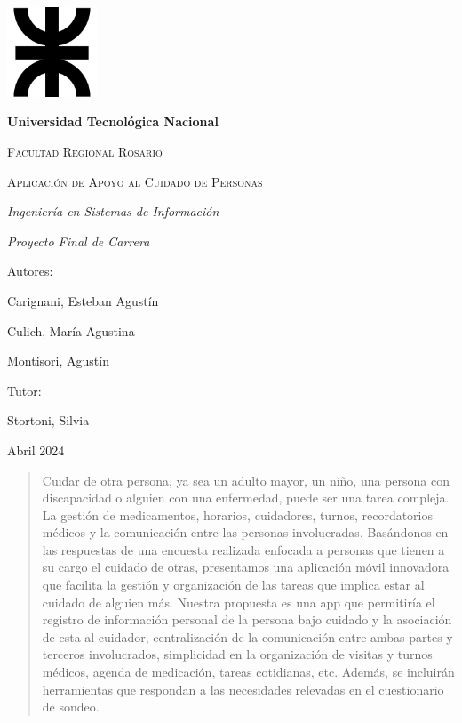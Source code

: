 \documentclass[a4paper,12pt]{article}
\begin{document}
    \begin{titlepage}
        \centering
        \includegraphics[width=0.2\textwidth]{Imagenes/LogoUTN.png}\par
        \vfill
        {\bfseries\LARGE Universidad Tecnológica Nacional \par}
        \vfill
        {\scshape\Large Facultad Regional Rosario \par}
        \vfill
        {\scshape\Huge Aplicación de Apoyo al Cuidado de Personas \par}
        \vfill
        {\itshape\Large Ingeniería en Sistemas de Información \par}
        {\itshape\Large Proyecto Final de Carrera \par}
        \vfill
        {\Large Autores: \par}
        {\Large Carignani, Esteban Agustín \par}
        {\Large Culich, María Agustina \par}
        {\Large Montisori, Agustín \par}
        \vfill
        {\Large Tutor: \par}
        {\Large Stortoni, Silvia \par}
        \vfill
        {\Large Abril 2024 \par}
    \end{titlepage}

    \begin{abstract}
        Cuidar de otra persona, ya sea un adulto mayor, 
        un niño, una persona con discapacidad o alguien 
        con una enfermedad, puede ser una tarea compleja. 
        La gestión de medicamentos, horarios, cuidadores, 
        turnos, recordatorios médicos y la comunicación 
        entre las personas involucradas.
        Basándonos en las respuestas de una encuesta realizada 
        enfocada a personas que tienen a su cargo el 
        cuidado de otras, presentamos una aplicación móvil 
        innovadora que facilita la gestión y organización de 
        las tareas que implica estar al cuidado de alguien más. 
        Nuestra propuesta es una app que permitiría el registro 
        de información personal de la persona bajo cuidado y 
        la asociación de esta al cuidador, centralización de 
        la comunicación entre ambas partes y terceros 
        involucrados, simplicidad en la organización de visitas 
        y turnos médicos, agenda de medicación, tareas 
        cotidianas, etc. Además, se incluirán herramientas que 
        respondan a las necesidades relevadas en el 
        cuestionario de sondeo.
    \end{abstract}

    
\end{document}

